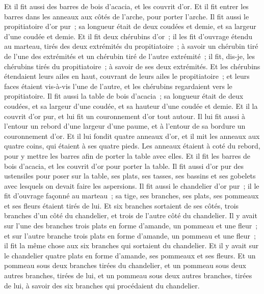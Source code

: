 \begin{multicols}{2}
Et il fit aussi des barres de bois d'acacia, et les couvrit d'or.
Et il fit entrer les barres dans les anneaux aux côtés de l'arche, pour porter l'arche.
Il fit aussi le propitiatoire d'or pur~; sa longueur était de deux coudées et demie, et sa largeur d'une coudée et demie.
Et il fit deux chérubins d'or~; il les fit d'ouvrage étendu au marteau, tirés des deux extrémités du propitiatoire~;
à savoir un chérubin tiré de l'une des extrémités et un chérubin tiré de l'autre extrémité~; il fit, dis-je, les chérubins tirés du propitiatoire~; à savoir de ses deux extrémités. 
Et les chérubins étendaient leurs ailes en haut, couvrant de leurs ailes le propitiatoire~; et leurs faces étaient vis-à-vis l'une de l'autre, et les chérubins regardaient vers le propitiatoire.
Il fit aussi la table de bois d'acacia~; sa longueur était de deux coudées, et sa largeur d'une coudée, et sa hauteur d'une coudée et demie.
Et il la couvrit d'or pur, et lui fit un couronnement d'or tout autour.
Il lui fit aussi à l'entour un rebord d'une largeur d'une paume, et à l'entour de sa bordure un couronnement d'or.
Et il lui fondit quatre anneaux d'or, et il mit les anneaux aux quatre coins, qui étaient à ses quatre pieds.
Les anneaux étaient à coté du rebord, pour y mettre les barres afin de porter la table avec elles.
Et il fit les barres de bois d'acacia, et les couvrit d'or pour porter la table.
Il fit aussi d'or pur des ustensiles pour poser sur la table, ses plats, ses tasses, ses bassins et ses gobelets avec lesquels on devait faire les aspersions.
Il fit aussi le chandelier d'or pur~; il le fit d'ouvrage façonné au marteau~; sa tige, ses branches, ses plats, ses pommeaux et ses fleurs étaient tirés de lui.
Et six branches sortaient de ses côtés, trois branches d'un côté du chandelier, et trois de l'autre côté du chandelier.
Il y avait sur l'une des branches trois plats en forme d'amande, un pommeau et une fleur~; et sur l'autre branche trois plats en forme d'amande, un pommeau et une fleur~; il fit la même chose aux six branches qui sortaient du chandelier.
Et il y avait sur le chandelier quatre plats en forme d'amande, ses pommeaux et ses fleurs.
Et un pommeau sous deux branches tirées du chandelier, et un pommeau sous deux autres branches, tirées de lui, et un pommeau sous deux autres branches, tirées de lui, à savoir des six branches qui procédaient du chandelier.

\end{multicols}
